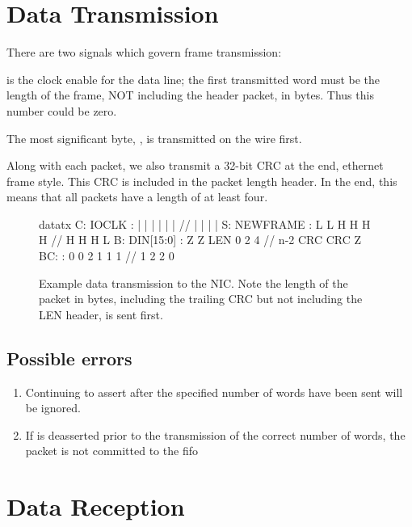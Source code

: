 
\section{Data Transmission}

There are two signals which govern frame transmission: 



 is the clock enable for the data line; the first
transmitted word must be the length of the frame, NOT including the
header packet, in bytes.  Thus this number could be zero.

The most significant byte, , is transmitted on the
wire first.

Along with each packet, we also transmit a 32-bit CRC at the end,
ethernet frame style. This CRC is included in the packet length
header. In the end, this means that all packets have a length of at
least four. 

\begin{figure}
\begin{timing}{datatx}
C: IOCLK     :  |  |  |   |   |   |   // |       |   |   | 
S: NEWFRAME  :  L  L  H   H   H   H   // H       H   H   L
B: DIN[15:0] :  Z  Z  LEN 0   2   4   // n-2     CRC CRC Z
BC:          :  0  0  2   1   1   1   // 1       2   2   0 
\end{timing}
\caption{Example data transmission to the NIC. Note the length of the
  packet in bytes, including the trailing CRC but not including the
  LEN header, is sent first.} 
\end{figure}

\subsection{Possible errors}
\begin{enumerate}
\item Continuing to assert  after the specified
  number of words have been sent will be ignored.
\item If  is deasserted prior to the transmission of the correct number of words, the packet is not committed to the fifo
\end{enumerate}

\section{Data Reception}

